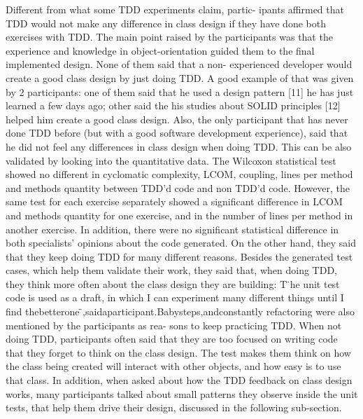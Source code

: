 Different from what some TDD experiments claim, partic- ipants affirmed that TDD would not make any difference in class design if they have done both exercises with TDD. The main point raised by the participants was that the experience and knowledge in object-orientation guided them to the final implemented design. None of them said that a non- experienced developer would create a good class design by just doing TDD.
A good example of that was given by 2 participants: one of them said that he used a design pattern [11] he has just learned a few days ago; other said the his studies about SOLID principles [12] helped him create a good class design. Also, the only participant that has never done TDD before (but with a good software development experience), said that he did not feel any differences in class design when doing TDD.
This can be also validated by looking into the quantitative data. The Wilcoxon statistical test showed no different in cyclomatic complexity, LCOM, coupling, lines per method and methods quantity between TDD’d code and non TDD’d code. However, the same test for each exercise separately showed a significant difference in LCOM and methods quantity for one exercise, and in the number of lines per method in another exercise. In addition, there were no significant statistical difference in both specialists’ opinions about the code generated.
On the other hand, they said that they keep doing TDD for many different reasons. Besides the generated test cases, which help them validate their work, they said that, when doing TDD, they think more often about the class design they are building: T ̈he unit test code is used as a draft, in which I can experiment many different things until I find thebetterone ̈,saidaparticipant.Babysteps,andconstantly refactoring were also mentioned by the participants as rea- sons to keep practicing TDD.
When not doing TDD, participants often said that they are too focused on writing code that they forget to think on the class design. The test makes them think on how the class being created will interact with other objects, and how easy is to use that class.
In addition, when asked about how the TDD feedback on class design works, many participants talked about small
patterns they observe inside the unit tests, that help them drive their design, discussed in the following sub-section.

